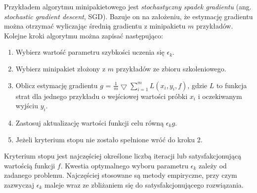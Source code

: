 Przykładem algorytmu minipakietowego jest \textit{stochastyczny spadek gradientu} (ang. \textit{stochastic gradient descent}, SGD). Bazuje on na założeniu, że estymację gradientu można otrzymać wyliczając średnią gradientu z minipakietu $m$ przykładów. Kolejne kroki algorytmu można zapisać następująco:
\begin{enumerate}
	\item Wybierz wartość parametru szybkości uczenia się $\epsilon_k$.
	\item Wybierz minipakiet złożony z $m$ przykładów ze zbioru szkoleniowego.
	\item Oblicz estymację gradientu $g$ = $\frac{1}{m}\bigtriangledown \sum_{i=1}^{m}L(x_i, y_i, f)$, gdzie $L$ to funkcja strat dla jednego przykładu o wejściowej wartości próbki $x_i$ i oczekiwanym wyjściu $y_i$.
	\item Zastosuj aktualizację wartości funkcji celu równą $\epsilon_k g$.
	\item Jeżeli kryterium stopu nie zostało spełnione wróć do kroku 2. 
\end{enumerate}

Kryterium stopu jest najczęściej określone liczbą iteracji lub satysfakcjonującą wartością funkcji $f$. Kwestia optymalnego wyboru parametru $\epsilon_k$ zależy od zadanego problemu. Najczęściej stosowane są metody empiryczne, przy czym zazwyczaj $\epsilon_k$ maleje wraz ze zbliżaniem się do satysfakcjonującego rozwiązania.

